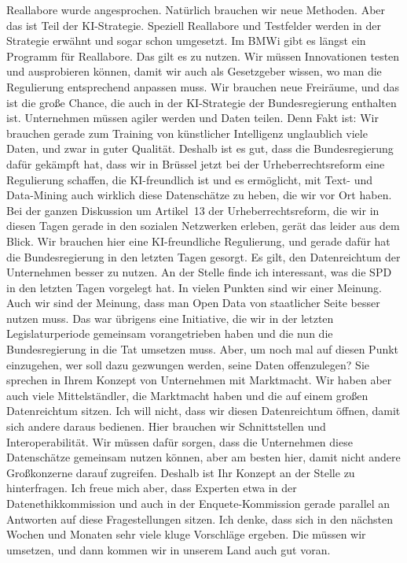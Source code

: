 \documentclass{article}
\begin{document}
Reallabore wurde angesprochen. Natürlich brauchen wir neue Methoden. Aber das ist Teil der KI-Strategie. Speziell Reallabore und Testfelder werden in der Strategie erwähnt und sogar schon umgesetzt. Im BMWi gibt es längst ein Programm für Reallabore. Das gilt es zu nutzen. Wir müssen Innovationen testen und ausprobieren können, damit wir auch als Gesetzgeber wissen, wo man die Regulierung entsprechend anpassen muss. Wir brauchen neue Freiräume, und das ist die große Chance, die auch in der KI-Strategie der Bundesregierung enthalten ist.  Unternehmen müssen agiler werden und Daten teilen. Denn Fakt ist: Wir brauchen gerade zum Training von künstlicher Intelligenz unglaublich viele Daten, und zwar in guter Qualität. Deshalb ist es gut, dass die Bundesregierung dafür gekämpft hat, dass wir in Brüssel jetzt bei der Urheberrechtsreform eine Regulierung schaffen, die KI-freundlich ist und es ermöglicht, mit Text- und Data-Mining auch wirklich diese Datenschätze zu heben, die wir vor Ort haben. Bei der ganzen Diskussion um Artikel 13 der Urheberrechtsreform, die wir in diesen Tagen gerade in den sozialen Netzwerken erleben, gerät das leider aus dem Blick. Wir brauchen hier eine KI-freundliche Regulierung, und gerade dafür hat die Bundesregierung in den letzten Tagen gesorgt. Es gilt, den Datenreichtum der Unternehmen besser zu nutzen. An der Stelle finde ich interessant, was die SPD in den letzten Tagen vorgelegt hat. In vielen Punkten sind wir einer Meinung. Auch wir sind der Meinung, dass man Open Data von staatlicher Seite besser nutzen muss. Das war übrigens eine Initiative, die wir in der letzten Legislaturperiode gemeinsam vorangetrieben haben und die nun die Bundesregierung in die Tat umsetzen muss. Aber, um noch mal auf diesen Punkt einzugehen, wer soll dazu gezwungen werden, seine Daten offenzulegen? Sie sprechen in Ihrem Konzept von Unternehmen mit Marktmacht. Wir haben aber auch viele Mittelständler, die Marktmacht haben und die auf einem großen Datenreichtum sitzen.  Ich will nicht, dass wir diesen Datenreichtum öffnen, damit sich andere daraus bedienen.  Hier brauchen wir Schnittstellen und Interoperabilität. Wir müssen dafür sorgen, dass die Unternehmen diese Datenschätze gemeinsam nutzen können, aber am besten hier, damit nicht andere Großkonzerne darauf zugreifen. Deshalb ist Ihr Konzept an der Stelle zu hinterfragen. Ich freue mich aber, dass Experten etwa in der Datenethikkommission und auch in der Enquete-Kommission gerade parallel an Antworten auf diese Fragestellungen sitzen. Ich denke, dass sich in den nächsten Wochen und Monaten sehr viele kluge Vorschläge ergeben. Die müssen wir umsetzen, und dann kommen wir in unserem Land auch gut voran.  
\end{document}
